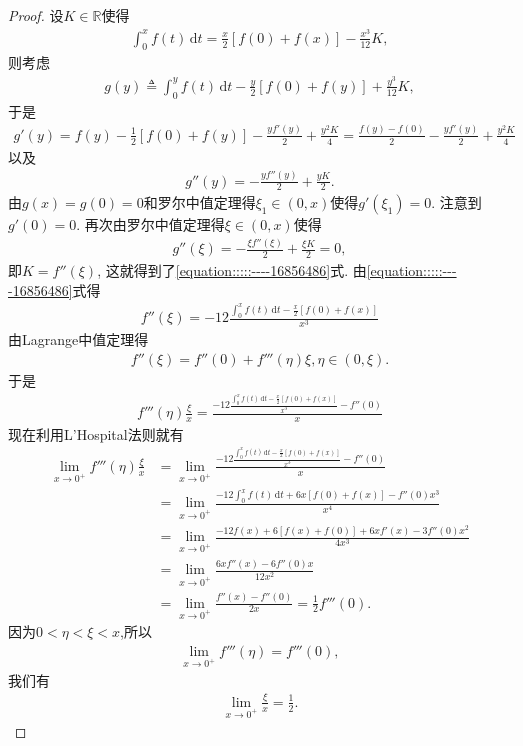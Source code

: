 \documentclass[../../main.tex]{subfiles}
\begin{document}
\begin{proof}
设$K \in \mathbb{R}$使得
\begin{align*}
\int_0^x f(t) \,\mathrm{d}t = \frac{x}{2}[f(0) + f(x)] - \frac{x^3}{12}K,
\end{align*}
则考虑
\begin{align*}
g(y) \triangleq \int_0^y f(t) \,\mathrm{d}t - \frac{y}{2}[f(0) + f(y)] + \frac{y^3}{12}K,
\end{align*}
于是
\begin{align*}
g'(y) = f(y) - \frac{1}{2}[f(0) + f(y)] - \frac{y f'(y)}{2} + \frac{y^2 K}{4} = \frac{f(y) - f(0)}{2} - \frac{y f'(y)}{2} + \frac{y^2 K}{4}
\end{align*}
以及
\begin{align*}
g''(y) = -\frac{y f''(y)}{2} + \frac{y K}{2}.
\end{align*}
由$g(x) = g(0) = 0$和罗尔中值定理得$\xi_1 \in (0,x)$使得$g'(\xi_1) = 0$. 注意到$g'(0) = 0$. 再次由罗尔中值定理得$\xi \in (0,x)$使得
\begin{align*}
g''(\xi) = -\frac{\xi f''(\xi)}{2} + \frac{\xi K}{2} = 0,
\end{align*}
即$K = f''(\xi)$, 这就得到了\eqref{equation:::::----16856486}式.
由\eqref{equation:::::----16856486}式得
\begin{align*}
f''(\xi) = -12 \frac{\int_0^x f(t) \,\mathrm{d}t - \frac{x}{2}[f(0) + f(x)]}{x^3}
\end{align*}
由Lagrange中值定理得
\begin{align*}
f''(\xi) = f''(0) + f'''(\eta) \xi, \eta \in (0,\xi).
\end{align*}
于是
\begin{align*}
f'''(\eta) \frac{\xi}{x} = \frac{-12 \frac{\int_0^x f(t) \,\mathrm{d}t - \frac{x}{2}[f(0) + f(x)]}{x^3} - f''(0)}{x}
\end{align*}
现在利用L'Hospital法则就有
\begin{align*}
\lim_{x \to 0^+} f'''(\eta) \frac{\xi}{x} &= \lim_{x \to 0^+} \frac{-12 \frac{\int_0^x f(t) \,\mathrm{d}t - \frac{x}{2}[f(0) + f(x)]}{x^3} - f''(0)}{x} \\
&= \lim_{x \to 0^+} \frac{-12 \int_0^x f(t) \,\mathrm{d}t + 6x [f(0) + f(x)] - f''(0) x^3}{x^4} \\
&= \lim_{x \to 0^+} \frac{-12 f(x) + 6 [f(x) + f(0)] + 6x f'(x) - 3 f''(0) x^2}{4x^3} \\
&= \lim_{x \to 0^+} \frac{6x f''(x) - 6 f''(0) x}{12x^2} \\
&= \lim_{x \to 0^+} \frac{f''(x) - f''(0)}{2x} = \frac{1}{2} f'''(0).
\end{align*}
因为$0<\eta<\xi<x$,所以
\begin{align*}
\lim_{x \to 0^+} f'''(\eta) = f'''(0),
\end{align*}
我们有
\begin{align*}
\lim_{x \to 0^+} \frac{\xi}{x} = \frac{1}{2}.
\end{align*}

\end{proof}
\end{document}
